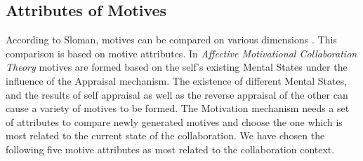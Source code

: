 \documentclass[12pt]{report}
\begin{document}
\subsection{Attributes of Motives}
\label{section-motive-attributes}

According to Sloman, motives can be compared on various dimensions
\cite{sloman:motivation}. This comparison is based on motive attributes. In
\textit{Affective Motivational Collaboration Theory} motives are formed based on
the self's existing Mental States under the influence of the Appraisal
mechanism. The existence of different Mental States, and the results of self
appraisal as well as the reverse appraisal of the other can cause a variety of
motives to be formed. The Motivation mechanism needs a set of attributes to
compare newly generated motives and choose the one which is most related to the
current state of the collaboration. We have chosen the following five motive
attributes as most related to the collaboration context.
\end{document}
